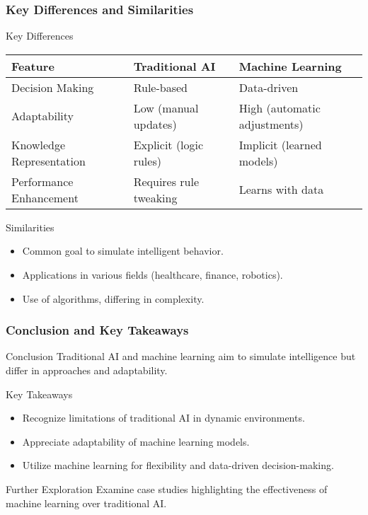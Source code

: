 \documentclass[aspectratio=169]{beamer}
\begin{document}
\begin{frame}[fragile]
    \frametitle{Key Differences and Similarities}
    \begin{block}{Key Differences}
        \begin{center}
            \begin{tabular}{|l|l|l|}
                \hline
                \textbf{Feature} & \textbf{Traditional AI} & \textbf{Machine Learning} \\
                \hline
                Decision Making & Rule-based & Data-driven \\
                Adaptability & Low (manual updates) & High (automatic adjustments) \\
                Knowledge Representation & Explicit (logic rules) & Implicit (learned models) \\
                Performance Enhancement & Requires rule tweaking & Learns with data \\
                \hline
            \end{tabular}
        \end{center}
    \end{block}
    \begin{block}{Similarities}
        \begin{itemize}
            \item Common goal to simulate intelligent behavior.
            \item Applications in various fields (healthcare, finance, robotics).
            \item Use of algorithms, differing in complexity.
        \end{itemize}
    \end{block}
\end{frame}

\begin{frame}[fragile]
    \frametitle{Conclusion and Key Takeaways}
    \begin{block}{Conclusion}
        Traditional AI and machine learning aim to simulate intelligence but differ in approaches and adaptability.
    \end{block}
    \begin{block}{Key Takeaways}
        \begin{itemize}
            \item Recognize limitations of traditional AI in dynamic environments.
            \item Appreciate adaptability of machine learning models.
            \item Utilize machine learning for flexibility and data-driven decision-making.
        \end{itemize}
    \end{block}
    \begin{block}{Further Exploration}
        Examine case studies highlighting the effectiveness of machine learning over traditional AI.
    \end{block}
\end{frame}
\end{document}
